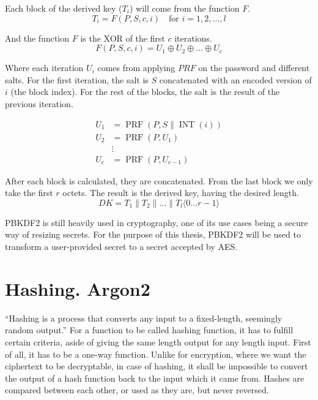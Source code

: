 Each block of the derived key ($T_i$) will come from the function $F$.
\begin{equation}
T_i = F(P, S, c, i) \quad \text{for } i = 1, 2, \dots, l
\end{equation}

And the function $F$ is the XOR of the first $c$ iterations.
\begin{equation}
F(P, S, c, i) = U_1 \oplus U_2 \oplus \dots \oplus U_c
\end{equation}

Where each iteration $U_i$ comes from applying $PRF$ on the password and different salts.
For the first iteration, the salt is $S$ concatenated with an encoded version of $i$ (the block index).
For the rest of the blocks, the salt is the result of the previous iteration.

\begin{align}
U_1 &= \operatorname{PRF}(P, S \parallel \operatorname{INT}(i)) \nonumber \\
U_2 &= \operatorname{PRF}(P, U_1) \nonumber \\
&\vdots \nonumber \\
U_c &= \operatorname{PRF}(P, U_{c-1})
\end{align}

After each block is calculated, they are concatenated.
From the last block we only take the first $r$ octets.
The result is the derived key, having the desired length.
\begin{equation}
DK = T_1 \parallel T_2 \parallel \dots \parallel T_l \langle 0 \dots r-1 \rangle
\end{equation}

PBKDF2 is still heavily used in cryptography, one of its use cases being a secure way of resizing secrets.
For the purpose of this thesis, PBKDF2 will be used to transform a user-provided secret to a secret accepted by AES.



\section{Hashing. Argon2} \label{lab:ch3-argon2}

``Hashing is a process that converts any input to a fixed-length, seemingly random output.''\cite{hashing}
For a function to be called hashing function, it has to fulfill certain criteria, aside of giving the same length output for any length input.
First of all, it has to be a one-way function.
Unlike for encryption, where we want the ciphertext to be decryptable, in case of hashing, it shall be impossible to convert the output of a hash function back to the input which it came from.
Hashes are compared between each other, or used as they are, but never reversed.

